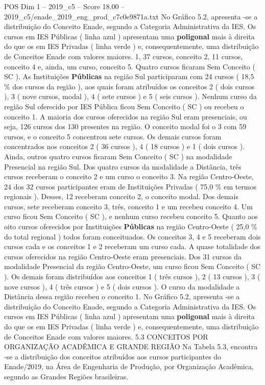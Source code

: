 \begin{textsample}{POS Dim 1 – 2019\_c5 – Score 18.00 – 2019\_c5/enade\_2019\_eng\_prod\_c7c0e9871a.txt}
No Gráfico 5.2, apresenta -se a distribuição do Conceito Enade, segundo a Categoria Administrativa da IES.
Os cursos em IES Públicas ( linha azul ) apresentam uma \textbf{poligonal} mais à direita do que os em IES Privadas ( linha verde ) e, consequentemente, uma distribuição de Conceitos Enade com valores maiores. 1, 37 cursos, conceito 2, 11 cursos, conceito 4 e, ainda, um curso, conceito 5.
Quatro cursos ficaram Sem Conceito ( SC ).
As Instituições \textbf{Públicas} na região Sul participaram com 24 cursos ( 18,5 \% dos cursos da região ), aos quais foram atribuídos os conceitos 2 ( dois cursos ), 3 ( nove cursos, modal ), 4 ( sete cursos ) e 5 ( seis cursos ).
Nenhum curso da região Sul oferecido por IES Pública ficou Sem Conceito ( SC ) ou recebeu o conceito 1.
A maioria dos cursos oferecidos na região Sul eram presenciais, ou seja, 126 cursos dos 130 presentes na região.
O conceito modal foi o 3 com 59 cursos, e o conceito 5 concentrou sete cursos.
Os demais cursos foram concentrados nos conceitos 2 ( 36 cursos ), 4 ( 18 cursos ) e 1 ( dois cursos ).
Ainda, outros quatro cursos ficaram Sem Conceito ( SC ) na modalidade Presencial na região Sul.
Dos quatro cursos da modalidade a Distância, três cursos receberam o conceito 2 e um curso o conceito 3.
Na região Centro-Oeste, 24 dos 32 cursos participantes eram de Instituições Privadas ( 75,0 \% em termos regionais ).
Desses, 12 receberam conceito 2, o conceito modal.
Dos demais cursos, sete receberam conceito 3, três, conceito 1 e um recebeu conceito 4.
Um curso ficou Sem Conceito ( SC ), e nenhum curso recebeu conceito 5.
Quanto aos oito cursos oferecidos por Instituições \textbf{Públicas} na região Centro-Oeste ( 25,0 \% do total regional ) todos foram conceituados.
Os conceitos 3, 4 e 5 receberam dois cursos cada e os conceitos 1 e 2 receberam um curso cada.
A quase totalidade dos cursos oferecidos na região Centro-Oeste eram presenciais.
Dos 31 cursos da modalidade Presencial da região Centro-Oeste, um curso ficou Sem Conceito ( SC ).
Os demais foram distribuídos aos conceitos 1 ( três cursos ), 2 ( 13 cursos ), 3 ( nove cursos ), 4 ( três cursos ) e 5 ( dois cursos ).
O curso da modalidade a Distância dessa região recebeu o conceito 1.
No Gráfico 5.2, apresenta -se a distribuição do Conceito Enade, segundo a Categoria Administrativa da IES.
Os cursos em IES Públicas ( linha azul ) apresentam uma \textbf{poligonal} mais à direita do que os em IES Privadas ( linha verde ) e, consequentemente, uma distribuição de Conceitos Enade com valores maiores. 5.3 CONCEITOS POR ORGANIZAÇÃO ACADÊMICA E GRANDE REGIÃO Na Tabela 5.3, encontra -se a distribuição dos conceitos atribuídos aos cursos participantes do Enade/2019, na Área de Engenharia de Produção, por Organização Acadêmica, segundo as Grandes Regiões brasileiras.

\end{textsample}
